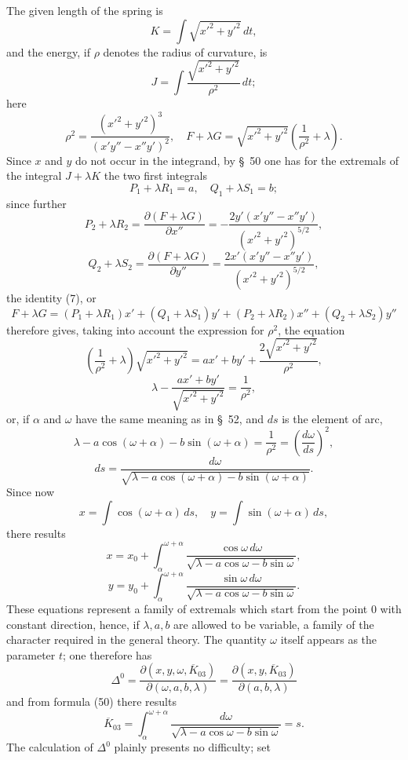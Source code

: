 \documentclass[11pt,a4paper,leqno]{article}
\begin{document}
The given length of the spring is
\[
K=\int\sqrt{x'^2+y'^2}\,dt,
\]
and the energy, if $\rho$ denotes the radius of curvature, is
\[
J=\int\frac{\sqrt{x'^2+y'^2}}{\rho^2}\,dt;
\]
here
\[
\rho^2=\frac{(x'^2+y'^2)^3}{(x'y''-x''y')^2},
\quad
F+\lambda G=\sqrt{x'^2+y'^2}\left(\frac1{\rho^2}+\lambda\right).
\]
Since $x$ and $y$ do not occur in the integrand, by \S~50 one has for the extremals of the integral $J+\lambda K$ the two first integrals
\[
P_1+\lambda R_1=a,\quad Q_1+\lambda S_1=b;
\]
since further
\[
P_2+\lambda R_2
=\frac{\partial(F+\lambda G)}{\partial x''}
=-\frac{2y'(x'y''-x''y')}{(x'^2+y'^2)^{5/2}},
\]
\[
Q_2+\lambda S_2
=\frac{\partial(F+\lambda G)}{\partial y''}
=\frac{2x'(x'y''-x''y')}{(x'^2+y'^2)^{5/2}},
\]
the identity (7), or
\[
F+\lambda G=(P_1+\lambda R_1)x'+(Q_1+\lambda S_1)y'
+(P_2+\lambda R_2)x''+(Q_2+\lambda S_2)y''
\]
therefore gives, taking into account the expression for $\rho^2$, the equation
\[
\left(\frac1{\rho^2}+\lambda\right)\sqrt{x'^2+y'^2}
=ax'+by'+\frac{2\sqrt{x'^2+y'^2}}{\rho^2},
\]
\[
\lambda-\frac{ax'+by'}{\sqrt{x'^2+y'^2}}=\frac1{\rho^2},
\]
or, if $\alpha$ and $\omega$ have the same meaning as in \S~52, and $ds$ is the element of arc,
\begin{equation}\tag{49}
\lambda-a\cos(\omega+\alpha)-b\sin(\omega+\alpha)
=\frac1{\rho^2}=\left(\frac{d\omega}{ds}\right)^2,
\end{equation}
\begin{equation}\tag{50}
ds=\frac{d\omega}{\sqrt{\lambda-a\cos(\omega+\alpha)-b\sin(\omega+\alpha)}}.
\end{equation}
Since now
\[
x=\int\cos(\omega+\alpha)\,ds,\quad
y=\int\sin(\omega+\alpha)\,ds,
\]
there results
\[
x=x_0+\int_\alpha^{\omega+\alpha}
\frac{\cos\omega\,d\omega}{\sqrt{\lambda-a\cos\omega-b\sin\omega}},
\]
\[
y=y_0+\int_\alpha^{\omega+\alpha}
\frac{\sin\omega\,d\omega}{\sqrt{\lambda-a\cos\omega-b\sin\omega}}.
\]
These equations represent a family of extremals which start from the point 0 with constant direction, hence, if $\lambda,a,b$ are allowed to be variable, a family of the character required in the general theory. The quantity $\omega$ itself appears as the parameter $t$; one therefore has
\[
\Delta^0=
\frac{\partial(x,y,\omega,\overline{K}_{03})}{\partial(\omega,a,b,\lambda)}
=
\frac{\partial(x,y,\overline{K}_{03})}{\partial(a,b,\lambda)}
\]
and from formula (50) there results
\[
\overline{K}_{03}=
\int_\alpha^{\omega+\alpha}\frac{d\omega}{\sqrt{\lambda-a\cos\omega-b\sin\omega}}=s.
\]
The calculation of $\Delta^0$ plainly presents no difficulty; set
\end{document}
